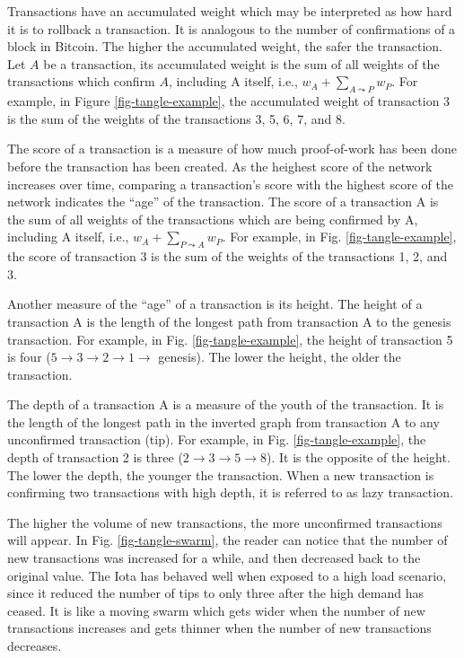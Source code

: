 Transactions have an accumulated weight which may be interpreted as how hard it is to rollback a transaction. It is analogous to the number of confirmations of a block in Bitcoin. The higher the accumulated weight, the safer the transaction. Let $A$ be a transaction, its accumulated weight is the sum of all weights of the transactions which confirm $A$, including A itself, i.e., $w_A + \sum_{A \leadsto P} w_P$. For example, in Figure \ref{fig-tangle-example}, the accumulated weight of transaction 3 is the sum of the weights of the transactions 3, 5, 6, 7, and 8.

The score of a transaction is a measure of how much proof-of-work has been done before the transaction has been created. As the heighest score of the network increases over time, comparing a transaction's score with the highest score of the network indicates the ``age'' of the transaction. The score of a transaction A is the sum of all weights of the transactions which are being confirmed by A, including A itself, i.e., $w_A + \sum_{P \leadsto A} w_P$. For example, in Fig. \ref{fig-tangle-example}, the score of transaction 3 is the sum of the weights of the transactions 1, 2, and 3.

Another measure of the ``age'' of a transaction is its height. The height of a transaction A is the length of the longest path from transaction A to the genesis transaction. For example, in Fig. \ref{fig-tangle-example}, the height of transaction 5 is four ($5 \rightarrow 3 \rightarrow 2 \rightarrow 1 \rightarrow$ genesis). The lower the height, the older the transaction.

The depth of a transaction A is a measure of the youth of the transaction. It is the length of the longest path in the inverted graph from transaction A to any unconfirmed transaction (tip). For example, in Fig. \ref{fig-tangle-example}, the depth of transaction 2 is three ($2 \rightarrow 3 \rightarrow 5 \rightarrow 8$). It is the opposite of the height. The lower the depth, the younger the transaction. When a new transaction is confirming two transactions with high depth, it is referred to as lazy transaction.

The higher the volume of new transactions, the more unconfirmed transactions will appear. In Fig. \ref{fig-tangle-swarm}, the reader can notice that the number of new transactions was increased for a while, and then decreased back to the original value. The Iota has behaved well when exposed to a high load scenario, since it reduced the number of tips to only three after the high demand has ceased. It is like a moving swarm which gets wider when the number of new transactions increases and gets thinner when the number of new transactions decreases.

